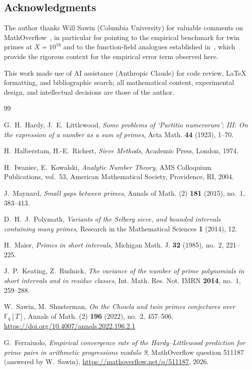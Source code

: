 \documentclass[11pt]{amsart}
\theoremstyle{plain}
\theoremstyle{definition}
\theoremstyle{remark}
\begin{document}
\subsection*{Acknowledgments}
The author thanks Will Sawin (Columbia University) for valuable
comments on MathOverflow~\cite{MOQ}, in particular for pointing to
the empirical benchmark for twin primes at $X = 10^{18}$ and to the
function-field analogues established in~\cite{SS22}, which provide
the rigorous context for the empirical error term observed here.

This work made use of AI assistance (Anthropic Claude) for code
review, \LaTeX{} formatting, and bibliographic search; all
mathematical content, experimental design, and intellectual decisions
are those of the author.

\begin{thebibliography}{99}

G.~H.~Hardy, J.~E.~Littlewood,
\emph{Some problems of `Partitio numerorum'; III: On the expression
of a number as a sum of primes},
Acta Math. \textbf{44} (1923), 1--70.

H.~Halberstam, H.-E.~Richert,
\emph{Sieve Methods},
Academic Press, London, 1974.

H.~Iwaniec, E.~Kowalski,
\emph{Analytic Number Theory},
AMS Colloquium Publications, vol.~53, American Mathematical Society,
Providence, RI, 2004.

J.~Maynard,
\emph{Small gaps between primes},
Annals of Math. (2) \textbf{181} (2015), no.~1, 383--413.

D.~H.~J.~Polymath,
\emph{Variants of the Selberg sieve, and bounded intervals containing
many primes},
Research in the Mathematical Sciences \textbf{1} (2014), 12.

H.~Maier,
\emph{Primes in short intervals},
Michigan Math. J. \textbf{32} (1985), no.~2, 221--225.

J.~P.~Keating, Z.~Rudnick,
\emph{The variance of the number of prime polynomials in short
intervals and in residue classes},
Int. Math. Res. Not. IMRN \textbf{2014}, no.~1, 259--288.

W.~Sawin, M.~Shusterman,
\emph{On the Chowla and twin primes conjectures over $\mathbb{F}_q[T]$},
Annals of Math. (2) \textbf{196} (2022), no.~2, 457--506.
\url{https://doi.org/10.4007/annals.2022.196.2.1}

G.~Ferraiuolo,
\emph{Empirical convergence rate of the Hardy--Littlewood prediction
for prime pairs in arithmetic progressions modulo 9},
MathOverflow question 511187 (answered by W.~Sawin),
\url{https://mathoverflow.net/q/511187}, 2026.


\end{thebibliography}
\end{document}
